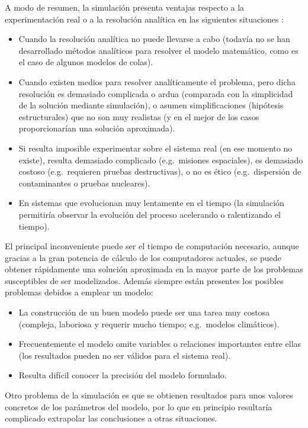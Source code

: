 \documentclass[
  10pt,
]{book}
\theoremstyle{break}
\theoremstyle{nonumberplain}
\begin{document}
A modo de resumen, la simulación presenta ventajas respecto a la experimentación real o a la resolución analítica en las siguientes situaciones \citep[que coinciden en gran medida con las ya descritas por][]{shannon1975systems}:

\begin{itemize}
\item
  Cuando la resolución analítica no puede llevarse a cabo (todavía no se han desarrollado métodos analíticos para resolver el modelo matemático, como es el caso de algunos modelos de colas).
\item
  Cuando existen medios para resolver analíticamente el problema, pero dicha resolución es demasiado complicada o ardua (comparada con la simplicidad de la solución mediante simulación), o asumen simplificaciones (hipótesis estructurales) que no son muy realistas (y en el mejor de los casos proporcionarían una solución aproximada).
\item
  Si resulta imposible experimentar sobre el sistema real (en ese momento no existe), resulta demasiado complicado (e.g.~misiones espaciales), es demasiado costoso (e.g.~requieren pruebas destructivas), o no es ético (e.g.~dispersión de contaminantes o pruebas nucleares).
\item
  En sistemas que evolucionan muy lentamente en el tiempo (la simulación permitiría observar la evolución del proceso acelerando o ralentizando el tiempo).
\end{itemize}

El principal inconveniente puede ser el tiempo de computación necesario, aunque gracias a la gran potencia de cálculo de los computadores actuales, se puede obtener rápidamente una solución aproximada en la mayor parte de los problemas susceptibles de ser modelizados.
Además siempre están presentes los posibles problemas debidos a emplear un modelo:

\begin{itemize}
\item
  La construcción de un buen modelo puede ser una tarea muy costosa
  (compleja, laboriosa y requerir mucho tiempo;
  e.g.~modelos climáticos).
\item
  Frecuentemente el modelo omite variables o relaciones importantes entre ellas
  (los resultados pueden no ser válidos para el sistema real).
\item
  Resulta difícil conocer la precisión del modelo formulado.
\end{itemize}

Otro problema de la simulación es que se obtienen resultados para unos valores concretos de los parámetros del modelo, por lo que en principio
resultaría complicado extrapolar las conclusiones a otras situaciones.
\end{document}
